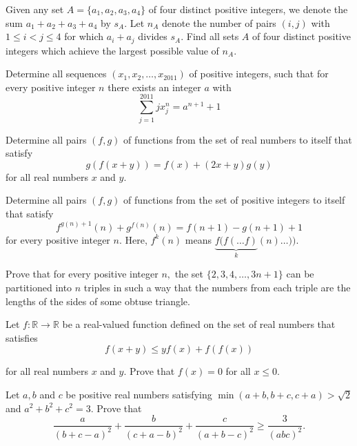 \item[\textbf{A1.}]
Given any set 
$A = \{a_1, a_2, a_3, a_4\}$
 of four distinct positive integers, we denote the sum 
$a_1 +a_2 +a_3 +a_4$
 by 
$s_A$.
 Let 
$n_A$
 denote the number of pairs 
$(i, j)$
 with 
$1 \leq  i < j \leq 4$
 for which 
$a_i +a_j$
 divides 
$s_A$.
 Find all sets 
$A$
 of four distinct positive integers which achieve the largest possible value of 
$n_A$.

\item[\textbf{A2.}]
Determine all sequences 
$(x_1,x_2,\ldots,x_{2011})$
 of positive integers, such that for every positive integer 
$n$
 there exists an integer 
$a$
 with 
\[\sum^{2011}_{j=1} j  x^n_j = a^{n+1} + 1\]

\item[\textbf{A3.}]
Determine all pairs 
$(f,g)$
 of functions from the set of real numbers to itself that satisfy 
\[g(f(x+y)) = f(x) + (2x + y)g(y)\]
 for all real numbers 
$x$
 and 
$y$.

\item[\textbf{A4.}]
Determine all pairs 
$(f,g)$
 of functions from the set of positive integers to itself that satisfy 
\[f^{g(n)+1}(n) + g^{f(n)}(n) = f(n+1) - g(n+1) + 1\]
 for every positive integer 
$n$.
 Here, 
$f^k(n)$
 means 
$\underbrace{f(f(\ldots f)}_{k}(n) \ldots ))$.

\item[\textbf{A5.}]
Prove that for every positive integer 
$n,$
 the set 
$\{2,3,4,\ldots,3n+1\}$
 can be partitioned into 
$n$
 triples in such a way that the numbers from each triple are the lengths of the sides of some obtuse triangle.

\item[\textbf{A6.}]
Let 
$f : \mathbb R \to \mathbb R$
 be a real-valued function defined on the set of real numbers that satisfies
\[f(x + y) \leq yf(x) + f(f(x))\]


for all real numbers 
$x$
 and 
$y$.
 Prove that 
$f(x) = 0$
 for all 
$x \leq 0$.

\item[\textbf{A7.}]
Let 
$a,b$
 and 
$c$
 be positive real numbers satisfying 
$\min(a+b,b+c,c+a) > \sqrt{2}$
 and 
$a^2+b^2+c^2=3.$
 Prove that
\[\frac{a}{(b+c-a)^2} + \frac{b}{(c+a-b)^2} + \frac{c}{(a+b-c)^2} \geq \frac{3}{(abc)^2}.\]

